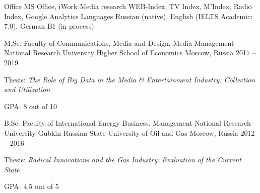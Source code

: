 \documentclass[11pt, a4paper]{awesome-cv}
\begin{document}
\begin{cvskills}
	\cvskill
		{Office}
		{MS Office, iWork}
	\cvskill
		{Media research}
		{WEB-Index, TV Index, M’Index, Radio Index, Google Analytics}
	\cvskill
		{Languages}
		{Russian (native), English (IELTS Academic: 7.0), German B1 (in process)}
\end{cvskills}

\begin{cventries}
\cventry
	{M.Sc. Faculty of Communications, Media and Design. Media Management}
	{National Research University Higher School of Economics}
	{Moscow, Russia}
	{2017 -- 2019}
	{
		\begin{cvitems}
			\item {Thesis: \textit{The Role of Big Data in the Media \& Entertainment Industry: Collection and Utilization}}
			\item {GPA: 8 out of 10}
		\end{cvitems}
	}
	
\cventry
	{B.Sc. Faculty of International Energy Business. Management}
	{National Research University Gubkin Russian State University of Oil and Gas}
	{Moscow, Russia}
	{2012 -- 2016}
	{
		\begin{cvitems}
			\item {Thesis: \textit{Radical Innovations and the Gas Industry: Evaluation of the Current State}}
			\item {GPA: 4.5 out of 5}
		\end{cvitems}
	}
	
\end{cventries}








































\end{document}
